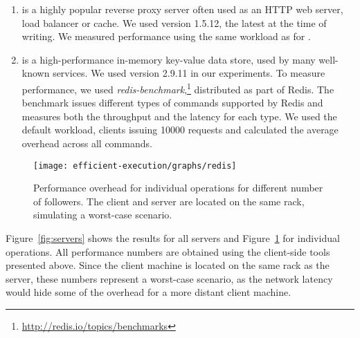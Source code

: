 \begin{enumerate}
\item[\nginx\footnote{\url{http://nginx.org/}}]
is a highly popular reverse proxy server often used as an HTTP web
server, load balancer or cache. We used version 1.5.12, the
latest at the time of writing.  We measured
performance using the same workload as for \lighttpdtwo.


\item[\redis\footnote{\url{http://redis.io/}}]
is a high-performance in-memory key-value data store, used by many
well-known services. %
We used version 2.9.11 in our experiments.  To measure
performance, we used
\emph{redis-benchmark},\footnote{\url{http://redis.io/topics/benchmarks}}
distributed as part of Redis. The benchmark issues different types
of commands supported by Redis and measures both the throughput and
the latency for each type. We used the default workload, 
clients issuing \num{10000} requests and calculated the average overhead
across all commands.

\end{enumerate}

\begin{figure}[!t]
 \centering
 \texttt{[image: efficient-execution/graphs/redis]}
 \caption{Performance overhead for individual \redis operations for different
 number of followers. The client and server are located on the same rack,
 simulating a worst-case scenario.}
 \label{fig:redis-ops}
\end{figure}

Figure~\ref{fig:servers} shows the results for all servers and
Figure~\ref{fig:redis-ops} for individual \redis operations. All
performance numbers are obtained using the client-side tools presented
above.  Since the client machine is located on the same rack as the
server, these numbers represent a worst-case scenario, as the network
latency would hide some of the overhead for a more distant client
machine.


